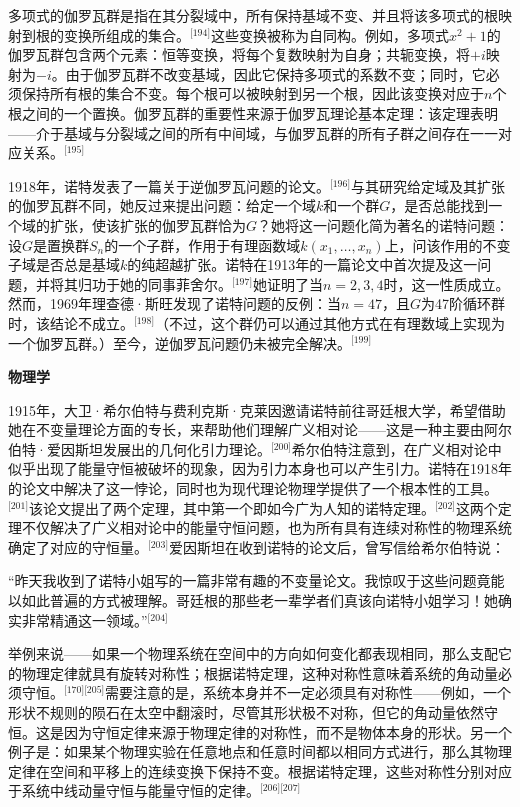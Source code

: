 多项式的伽罗瓦群是指在其分裂域中，所有保持基域不变、并且将该多项式的根映射到根的变换所组成的集合。\(^\text{[194]}\)这些变换被称为自同构。例如，多项式$x^2 + 1$的伽罗瓦群包含两个元素：恒等变换，将每个复数映射为自身；共轭变换，将$+i$映射为$-i$。由于伽罗瓦群不改变基域，因此它保持多项式的系数不变；同时，它必须保持所有根的集合不变。每个根可以被映射到另一个根，因此该变换对应于$n$个根之间的一个置换。伽罗瓦群的重要性来源于伽罗瓦理论基本定理：该定理表明——介于基域与分裂域之间的所有中间域，与伽罗瓦群的所有子群之间存在一一对应关系。\(^\text{[195]}\)

1918年，诺特发表了一篇关于逆伽罗瓦问题的论文。\(^\text{[196]}\)与其研究给定域及其扩张的伽罗瓦群不同，她反过来提出问题：给定一个域$k$和一个群$G$，是否总能找到一个域的扩张，使该扩张的伽罗瓦群恰为$G$？她将这一问题化简为著名的诺特问题：设$G$是置换群$S_n$的一个子群，作用于有理函数域$k(x_1, \ldots, x_n)$上，问该作用的不变子域是否总是基域$k$的纯超越扩张。诺特在1913年的一篇论文中首次提及这一问题，并将其归功于她的同事菲舍尔。\(^\text{[197]}\)她证明了当$n = 2, 3, 4$时，这一性质成立。然而，1969年理查德·斯旺发现了诺特问题的反例：当$n = 47$，且$G$为47阶循环群时，该结论不成立。\(^\text{[198]}\)（不过，这个群仍可以通过其他方式在有理数域上实现为一个伽罗瓦群。）至今，逆伽罗瓦问题仍未被完全解决。\(^\text{[199]}\)

\textbf{物理学}

1915年，大卫·希尔伯特与费利克斯·克莱因邀请诺特前往哥廷根大学，希望借助她在不变量理论方面的专长，来帮助他们理解广义相对论——这是一种主要由阿尔伯特·爱因斯坦发展出的几何化引力理论。\(^\text{[200]}\)希尔伯特注意到，在广义相对论中似乎出现了能量守恒被破坏的现象，因为引力本身也可以产生引力。诺特在1918年的论文中解决了这一悖论，同时也为现代理论物理学提供了一个根本性的工具。\(^\text{[201]}\)该论文提出了两个定理，其中第一个即如今广为人知的诺特定理。\(^\text{[202]}\)这两个定理不仅解决了广义相对论中的能量守恒问题，也为所有具有连续对称性的物理系统确定了对应的守恒量。\(^\text{[203]}\)爱因斯坦在收到诺特的论文后，曾写信给希尔伯特说：

“昨天我收到了诺特小姐写的一篇非常有趣的不变量论文。我惊叹于这些问题竟能以如此普遍的方式被理解。哥廷根的那些老一辈学者们真该向诺特小姐学习！她确实非常精通这一领域。”\(^\text{[204]}\)

举例来说——如果一个物理系统在空间中的方向如何变化都表现相同，那么支配它的物理定律就具有旋转对称性；根据诺特定理，这种对称性意味着系统的角动量必须守恒。\(^\text{[170][205]}\)需要注意的是，系统本身并不一定必须具有对称性——例如，一个形状不规则的陨石在太空中翻滚时，尽管其形状极不对称，但它的角动量依然守恒。这是因为守恒定律来源于物理定律的对称性，而不是物体本身的形状。另一个例子是：如果某个物理实验在任意地点和任意时间都以相同方式进行，那么其物理定律在空间和平移上的连续变换下保持不变。根据诺特定理，这些对称性分别对应于系统中线动量守恒与能量守恒的定律。\(^\text{[206][207]}\)

